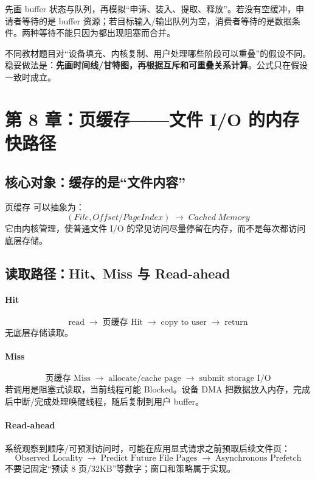\documentclass[UTF8,fontset=fandol,11pt,a4paper]{ctexart}
\newcommand{\kw}[1]{\textbf{#1}}
\newcommand{\arr}{\;\longrightarrow\;}
\begin{document}
\begin{exam}[缓冲池题的固定检查]
先画 buffer 状态与队列，再模拟“申请、装入、提取、释放”。若没有空缓冲，申请者等待的是 buffer 资源；若目标输入/输出队列为空，消费者等待的是数据条件。两种等待不能只因为都出现阻塞而合并。
\end{exam}

\begin{exam}[缓冲题不要死背总时间公式]
不同教材题目对“设备填充、内核复制、用户处理哪些阶段可以重叠”的假设不同。稳妥做法是：\kw{先画时间线/甘特图，再根据互斥和可重叠关系计算}。公式只在假设一致时成立。
\end{exam}

\section{第 8 章：页缓存——文件 I/O 的内存 快路径}

\subsection{核心对象：缓存的是“文件内容”}
页缓存 可以抽象为：
\[
\boxed{(File,Offset/PageIndex)\arr Cached\ Memory}
\]
它由内核管理，使普通文件 I/O 的常见访问尽量停留在内存，而不是每次都访问底层存储。

\subsection{读取路径：Hit、Miss 与 Read-ahead}
\paragraph{Hit}
\[
\text{read}\arr\text{页缓存 Hit}\arr\text{copy to user}\arr\text{return}
\]
无底层存储读取。

\paragraph{Miss}
\[
\text{页缓存 Miss}\arr\text{allocate/cache page}\arr\text{submit storage I/O}
\]
若调用是阻塞式读取，当前线程可能 Blocked。设备 DMA 把数据放入内存，完成后中断/完成处理唤醒线程，随后复制到用户 buffer。

\paragraph{Read-ahead}
系统观察到顺序/可预测访问时，可能在应用显式请求之前预取后续文件页：
\[
\boxed{\text{Observed Locality}\arr\text{Predict Future File Pages}\arr\text{Asynchronous Prefetch}}
\]
不要记固定“预读 8 页/32KB”等数字；窗口和策略属于实现。
\end{document}
